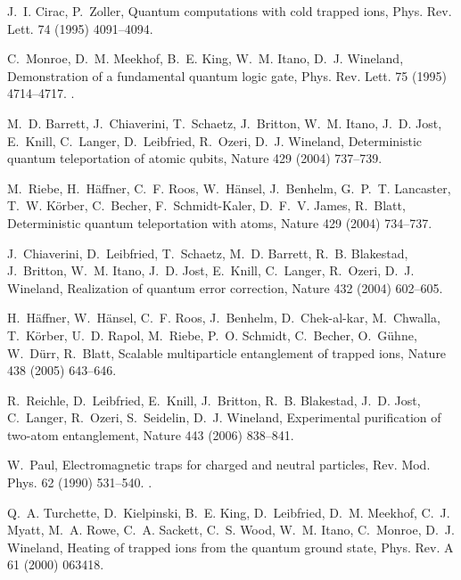 \documentclass[3p,sort&compress]{elsarticle}
\begin{document}
\begin{thebibliography}{100}
J.~I. Cirac, P.~Zoller, Quantum computations with cold trapped ions, Phys. Rev.
  Lett. 74 (1995) 4091--4094.

C.~Monroe, D.~M. Meekhof, B.~E. King, W.~M. Itano, D.~J. Wineland,
  Demonstration of a fundamental quantum logic gate, Phys. Rev. Lett. 75 (1995)
  4714--4717.
\newblock \href {http://dx.doi.org/10.1103/PhysRevLett.75.4714}
  {}.

M.~D. Barrett, J.~Chiaverini, T.~Schaetz, J.~Britton, W.~M. Itano, J.~D. Jost,
  E.~Knill, C.~Langer, D.~Leibfried, R.~Ozeri, D.~J. Wineland, Deterministic
  quantum teleportation of atomic qubits, Nature 429 (2004) 737--739.

M.~Riebe, H.~H{\"a}ffner, C.~F. Roos, W.~H{\"a}nsel, J.~Benhelm, G.~P.~T.
  Lancaster, T.~W. K{\"o}rber, C.~Becher, F.~Schmidt-Kaler, D.~F.~V. James,
  R.~Blatt, Deterministic quantum teleportation with atoms, Nature 429 (2004)
  734--737.

J.~Chiaverini, D.~Leibfried, T.~Schaetz, M.~D. Barrett, R.~B. Blakestad,
  J.~Britton, W.~M. Itano, J.~D. Jost, E.~Knill, C.~Langer, R.~Ozeri, D.~J.
  Wineland, Realization of quantum error correction, Nature 432 (2004)
  602--605.

H.~H{\"a}ffner, W.~H{\"a}nsel, C.~F. Roos, J.~Benhelm, D.~{Chek-al-kar},
  M.~Chwalla, T.~K{\"o}rber, U.~D. Rapol, M.~Riebe, P.~O. Schmidt, C.~Becher,
  O.~G{\"u}hne, W.~D{\"u}rr, R.~Blatt, Scalable multiparticle entanglement of
  trapped ions, Nature 438 (2005) 643--646.

R.~Reichle, D.~Leibfried, E.~Knill, J.~Britton, R.~B. Blakestad, J.~D. Jost,
  C.~Langer, R.~Ozeri, S.~Seidelin, D.~J. Wineland, Experimental purification
  of two-atom entanglement, Nature 443 (2006) 838--841.

W.~Paul, Electromagnetic traps for charged and neutral particles, Rev. Mod.
  Phys. 62 (1990) 531--540.
\newblock \href {http://dx.doi.org/10.1103/RevModPhys.62.531}
  {}.

Q.~A. Turchette, D.~Kielpinski, B.~E. King, D.~Leibfried, D.~M. Meekhof, C.~J.
  Myatt, M.~A. Rowe, C.~A. Sackett, C.~S. Wood, W.~M. Itano, C.~Monroe, D.~J.
  Wineland, Heating of trapped ions from the quantum ground state, Phys. Rev. A
  61 (2000) 063418.


\end{thebibliography}
\end{document}
